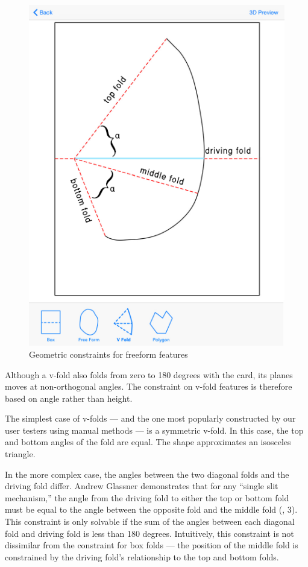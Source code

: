 \begin{figure}[htbp]
\centering
\includegraphics{figures/45_Tech_Constraints/vfoldConstraints.pdf}
\caption{Geometric constraints for freeform features}
\end{figure}

Although a v-fold also folds from zero to 180 degrees with the card, its
planes moves at non-orthogonal angles. The constraint on v-fold features
is therefore based on angle rather than height.

The simplest case of v-folds --- and the one most popularly constructed
by our user testers using manual methods --- is a symmetric v-fold. In
this case, the top and bottom angles of the fold are equal. The shape
approximates an isosceles triangle.

In the more complex case, the angles between the two diagonal folds and
the driving fold differ. Andrew Glassner demonstrates that for any
``single slit mechanism,'' the angle from the driving fold to either the
top or bottom fold must be equal to the angle between the opposite fold
and the middle fold (\citet{glassner1998interactive}, 3). This
constraint is only solvable if the sum of the angles between each
diagonal fold and driving fold is less than 180 degrees. Intuitively,
this constraint is not dissimilar from the constraint for box folds ---
the position of the middle fold is constrained by the driving fold's
relationship to the top and bottom folds.

